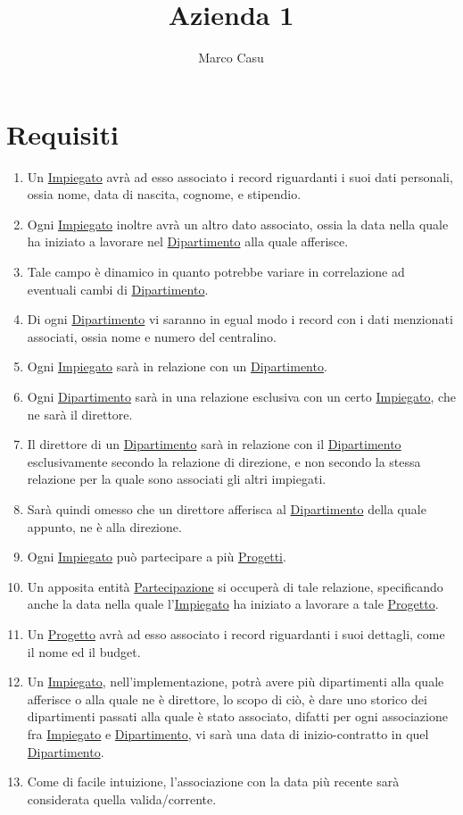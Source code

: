\documentclass[12pt, letterpaper]{article}
\title{Azienda 1}
\author{Marco Casu}
\date{\vspace{-5ex}}
\begin{document}
\maketitle
\begin{figure}[h]
    \centering{
    
    }
\end{figure}
\section{Requisiti}
\begin{enumerate}
    \item Un \underline{Impiegato} avrà ad esso associato i record riguardanti i suoi 
    dati personali, ossia nome, data di nascita, cognome, e stipendio.
    \item Ogni \underline{Impiegato} inoltre avrà un altro dato associato, ossia la data nella 
    quale ha iniziato a lavorare nel \underline{Dipartimento} alla quale afferisce.
    \item Tale campo è dinamico in quanto potrebbe variare in correlazione ad eventuali 
    cambi di \underline{Dipartimento}.
    \item Di ogni \underline{Dipartimento} vi saranno in egual modo i record con i dati menzionati 
    associati, ossia nome e numero del centralino.
    \item Ogni \underline{Impiegato} sarà in relazione con un \underline{Dipartimento}.
    \item Ogni \underline{Dipartimento} sarà in una relazione esclusiva con un certo 
    \underline{Impiegato}, che ne sarà il direttore. 
    \item Il direttore di un \underline{Dipartimento} sarà in relazione con il 
    \underline{Dipartimento} esclusivamente secondo la relazione di direzione, e non 
    secondo la stessa relazione per la quale sono associati gli altri impiegati.
    \item Sarà quindi omesso che un direttore afferisca al \underline{Dipartimento}
    della quale appunto, ne è alla direzione.
    \item Ogni \underline{Impiegato} può partecipare a più \underline{Progetti}. 
    \item Un apposita entità \underline{Partecipazione} si occuperà di tale relazione, specificando 
    anche la data nella quale l'\underline{Impiegato} ha iniziato a lavorare a tale 
    \underline{Progetto}.
    \item Un \underline{Progetto} avrà ad esso associato i record riguardanti i suoi 
    dettagli, come il nome ed il budget.
    \item Un  \underline{Impiegato}, nell'implementazione, potrà avere più dipartimenti alla quale 
    afferisce o alla quale ne è direttore, lo scopo di ciò, è dare uno storico dei dipartimenti 
    passati alla quale è stato associato, difatti per ogni associazione fra  \underline{Impiegato} e \underline{Dipartimento},
    vi sarà una data di inizio-contratto in quel \underline{Dipartimento}.
    \item Come di facile intuizione, l'associazione con la data più recente sarà considerata 
    quella valida/corrente.
\end{enumerate}
\newpage
\end{document}
